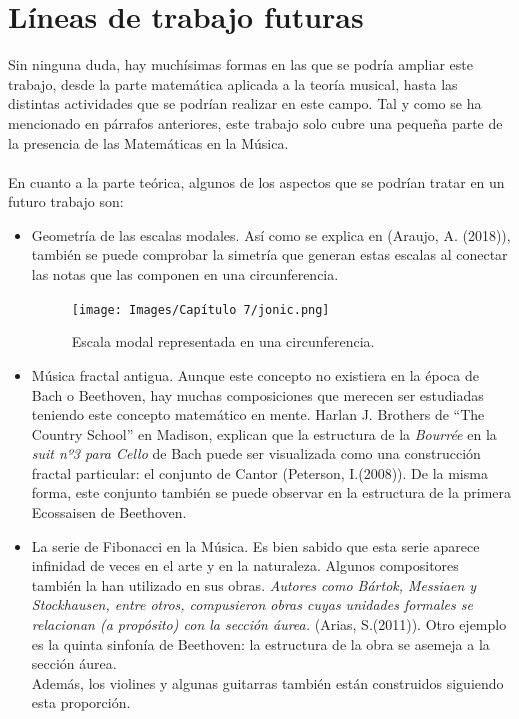 \documentclass[a4paper, openright, 11pt, titlepage]{report}
\theoremstyle{definition}\newtheorem{defin}[propo]{Definition}
\theoremstyle{definition}\newtheorem{obser}[propo]{Remark}
\theoremstyle{definition}\newtheorem{ejem}[propo]{Ejemplo}
\theoremstyle{definition}\newtheorem{algoritmo}[propo]{Algoritmo}
\begin{document}
\section{Líneas de trabajo futuras}
Sin ninguna duda, hay muchísimas formas en las que se podría ampliar este trabajo, desde la parte matemática aplicada a la teoría musical, hasta las distintas actividades que se podrían realizar en este campo. Tal y como se ha mencionado en párrafos anteriores, este trabajo solo cubre una pequeña parte de la presencia de las Matemáticas en la Música.\\\\
En cuanto a la parte teórica, algunos de los aspectos que se podrían tratar en un futuro trabajo son: 
\begin{itemize}
    \item Geometría de las escalas modales. Así como se explica en \cite{futuras1} (Araujo, A. (2018)), también se puede comprobar la simetría que generan estas escalas al conectar las notas que las componen en una circunferencia.
    \begin{figure}[H]
        \centering
        \texttt{[image: Images/Capítulo 7/jonic.png]}
        \caption{Escala modal representada en una circunferencia. \cite{futuras1}}
    \end{figure}
    \item Música fractal antigua. Aunque este concepto no existiera en la época de Bach o Beethoven, hay muchas composiciones que merecen ser estudiadas teniendo este concepto matemático en mente. Harlan J. Brothers de ``The Country School'' en Madison, explican que la estructura de la \textit{Bourrée} en la \textit{suit nº3 para Cello} de Bach puede ser visualizada como una construcción fractal particular: el conjunto de Cantor \cite{futuras2} (Peterson, I.(2008)). De la misma forma, este conjunto también se puede observar en la estructura de la primera Ecossaisen de Beethoven. 
    \item La serie de Fibonacci en la Música. Es bien sabido que esta serie aparece infinidad de veces en el arte y en la naturaleza. Algunos compositores también la han utilizado en sus obras. \textit{Autores como Bártok, Messiaen y Stockhausen, entre otros, compusieron obras cuyas unidades formales se relacionan (a propósito) con la sección áurea.} \cite{futuras3} (Arias, S.(2011)). Otro ejemplo es la quinta sinfonía de Beethoven: la estructura de la obra se asemeja a la sección áurea.\\
    Además, los violines y algunas guitarras también están construidos siguiendo esta proporción. 
\end{itemize}
\end{document}
